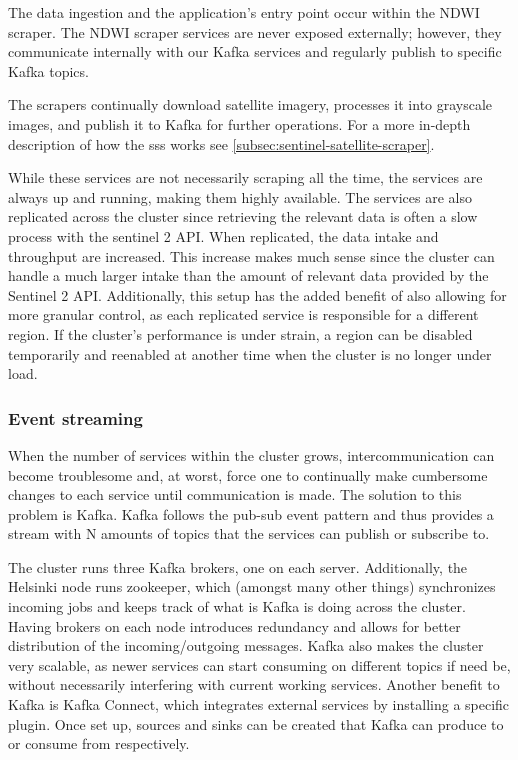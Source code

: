 The data ingestion and the application's entry point occur within the NDWI scraper. The NDWI scraper services are never exposed externally; however, they communicate internally with our Kafka services and regularly publish to specific Kafka topics. 

The scrapers continually download satellite imagery, processes it into grayscale images, and publish it to Kafka for further operations. For a more in-depth description of how the \acrfull{sss} works see \autoref{subsec:sentinel-satellite-scraper}.

While these services are not necessarily scraping all the time, the services are always up and running, making them highly available. The services are also replicated across the cluster since retrieving the relevant data is often a slow process with the sentinel 2 API. When replicated, the data intake and throughput are increased. This increase makes much sense since the cluster can handle a much larger intake than the amount of relevant data provided by the Sentinel 2 API. Additionally, this setup has the added benefit of also allowing for more granular control, as each replicated service is responsible for a different region. If the cluster's performance is under strain, a region can be disabled temporarily and reenabled at another time when the cluster is no longer under load.

\subsubsection{Event streaming}

When the number of services within the cluster grows, intercommunication can become troublesome and, at worst, force one to continually make cumbersome changes to each service until communication is made. The solution to this problem is Kafka. Kafka follows the pub-sub event pattern and thus provides a stream with N amounts of topics that the services can publish or subscribe to.

The cluster runs three Kafka brokers, one on each server. Additionally, the Helsinki node runs zookeeper, which (amongst many other things) synchronizes incoming jobs and keeps track of what is Kafka is doing across the cluster. Having brokers on each node introduces redundancy and allows for better distribution of the incoming/outgoing messages. Kafka also makes the cluster very scalable, as newer services can start consuming on different topics if need be, without necessarily interfering with current working services. Another benefit to Kafka is Kafka Connect, which integrates external services by installing a specific plugin. Once set up, sources and sinks can be created that Kafka can produce to or consume from respectively.

